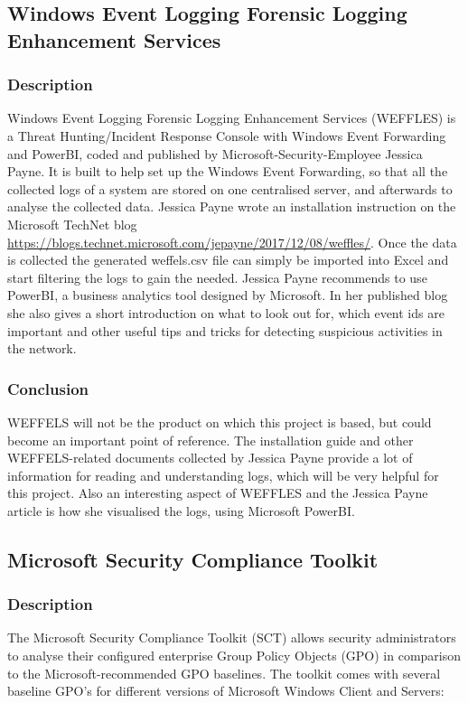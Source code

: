 \subsection{Windows Event Logging Forensic Logging Enhancement Services}
\subsubsection{Description}
Windows Event Logging Forensic Logging Enhancement Services (WEFFLES) is a Threat Hunting/Incident Response Console with Windows Event Forwarding and PowerBI, coded and published by Microsoft-Security-Employee Jessica Payne. It is built to help set up the Windows Event Forwarding, so that all the collected logs of a system are stored on one centralised server, and afterwards to analyse the collected data. Jessica Payne wrote an installation instruction on the Microsoft TechNet blog \url{https://blogs.technet.microsoft.com/jepayne/2017/12/08/weffles/}. Once the data is collected  the generated weffels.csv file can simply be imported into Excel and start filtering the logs to gain the needed. Jessica Payne recommends to use PowerBI, a business analytics tool designed by Microsoft. In her published blog she also gives a short introduction on what to look out for, which event ids are important and other useful tips and tricks for detecting suspicious activities in the network.
\subsubsection{Conclusion}
WEFFELS will not be the product on which this project is based, but could become an important point of reference. The installation guide and other WEFFELS-related documents collected by Jessica Payne provide a lot of information for reading and understanding logs, which will be very helpful for this project. Also an interesting aspect of WEFFLES and the Jessica Payne article is how she visualised the logs, using Microsoft PowerBI.


\subsection{Microsoft Security Compliance Toolkit}
\subsubsection{Description}
The Microsoft Security Compliance Toolkit (SCT) \cite{SCT} allows security administrators to analyse their configured enterprise Group Policy Objects (GPO) in comparison to the Microsoft-recommended GPO baselines. The toolkit comes with  several baseline GPO's for different versions of Microsoft Windows Client and Servers:

